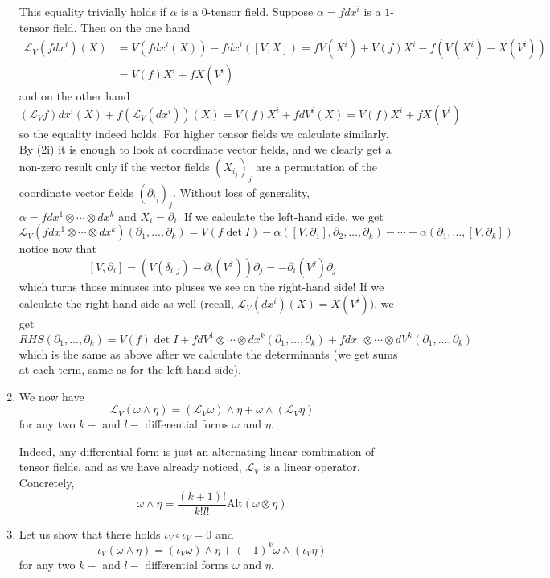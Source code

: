 \documentclass[a4paper, 12pt]{article}
\begin{document}
\begin{Exercise}
\begin{enumerate}[label=(\roman*)]
            This equality trivially holds if $\alpha$ is a $0$-tensor field.
            Suppose $\alpha = f dx^i$ is a $1$-tensor field.
            Then on the one hand
            \begin{align*}
                \mathcal{L}_V(fdx^i)(X)
                &= V(fdx^i(X)) - fdx^i([V,X])
                = fV(X^i) + V(f)X^i - f(V(X^i) - X(V^i)) \\
                &= V(f)X^i + fX(V^i)
            \end{align*}
            and on the other hand
            \[
                (\mathcal{L}_Vf)dx^i (X) + f(\mathcal{L}_V(dx^i))(X)
                = V(f) X^i + f dV^i (X) = V(f) X^i + fX(V^i)
            \]
            so the equality indeed holds.
            For higher tensor fields we calculate similarly.
            By (2i) it is enough to look at coordinate vector fields,
            and we clearly get a non-zero result only if the vector fields $(X_{i_j})_j$ are a permutation of the coordinate vector fields $(\partial_{i_j})_j$.
            Without loss of generality, $\alpha = fdx^1\otimes\cdots\otimes dx^k$ and $X_i = \partial_i$.
            If we calculate the left-hand side, we get
            \[
                \mathcal{L}_V(fdx^1\otimes\cdots\otimes dx^k)(\partial_1,\dots,\partial_k)
                = V(f\det I) - \alpha([V,\partial_1],\partial_2,\dots,\partial_k) - \cdots - \alpha(\partial_1,\dots,[V,\partial_k])
            \]
            notice now that
            \[
                [V,\partial_i] = (V(\delta_{i,j}) - \partial_i(V^j))\partial_j = - \partial_i(V^j)\partial_j
            \]
            which turns those minuses into pluses we see on the right-hand side!
            If we calculate the right-hand side as well
            (recall, $\mathcal{L}_V(dx^i)(X) = X(V^i)$),
            we get
            \[
                RHS(\partial_1,\dots,\partial_k)
                = V(f)\det I + f dV^1\otimes\cdots\otimes dx^k(\partial_1,\dots,\partial_k) + f dx^1\otimes\cdots\otimes dV^k(\partial_1,\dots,\partial_k)
            \]
            which is the same as above after we calculate the determinants (we get sums at each term, same as for the left-hand side).
        \item We now have
            \[
                \mathcal{L}_V(\omega\wedge\eta) = (\mathcal{L}_V\omega)\wedge\eta + \omega\wedge(\mathcal{L}_V\eta)
            \]
            for any two $k-$ and $l-$ differential forms $\omega$ and $\eta$.

            Indeed, any differential form is just an alternating linear combination of tensor fields,
            and as we have already noticed, $\mathcal{L}_V$ is a linear operator.
            Concretely,
            \[
                \omega\wedge\eta = \frac{(k+1)!}{k!l!}\text{Alt}(\omega\otimes\eta)
            \]
        \item Let us show that there holds $\iota_V\circ\iota_V = 0$ and
            \[
                \iota_V(\omega\wedge\eta) = (\iota_V\omega)\wedge\eta + (-1)^{k}\omega\wedge(\iota_V\eta)
            \]
            for any two $k-$ and $l-$ differential forms $\omega$ and $\eta$.
            

\end{enumerate}
\end{Exercise}
\end{document}
